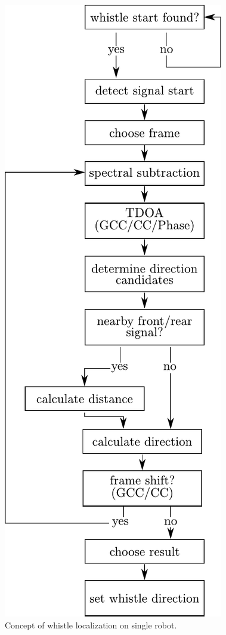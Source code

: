 \begin{figure}[ht]
	\centering
		\includegraphics[height=0.7\textheight]{figures/state_machine}
	\caption{Concept of whistle localization on single robot.}
	\label{fig:04_stateMachine}
\end{figure}

